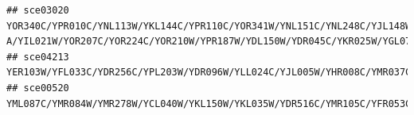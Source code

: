 \documentclass[
]{book}
\begin{document}
\begin{verbatim}
## sce03020                                                                                                                                                                                                                                                                                                                                                                                                                                                                                                                                                                                                                                                                                                                                                                                                                               YOR340C/YPR010C/YNL113W/YKL144C/YPR110C/YOR341W/YNL151C/YNL248C/YJL148W/YJR063W/YBR154C/YHR143W-A/YIL021W/YOR207C/YOR224C/YOR210W/YPR187W/YDL150W/YDR045C/YKR025W/YGL070C
## sce04213                                                                                                                                                                                                                                                                                                                                                                                                                                                                                                                                                                                                                                                                                                                                                                                                                                                 YER103W/YFL033C/YDR256C/YPL203W/YDR096W/YLL024C/YJL005W/YHR008C/YMR037C/YKL062W/YNL098C/YPL015C/YJL164C/YBL075C/YAL005C/YLL026W/YGL037C/YDR258C/YGR088W
## sce00520                                                                                                                                                                                                                                                                                                                                                                                                                                                                                                                                                                                                                                                                                                                                                                                                                                                                                                                                 YML087C/YMR084W/YMR278W/YCL040W/YKL150W/YKL035W/YDR516C/YMR105C/YFR053C
\end{verbatim}
\end{document}
